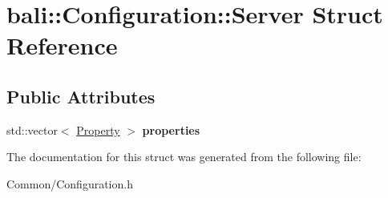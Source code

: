 \hypertarget{structbali_1_1_configuration_1_1_server}{\section{bali\-:\-:Configuration\-:\-:Server Struct Reference}
\label{structbali_1_1_configuration_1_1_server}
}
\subsection*{Public Attributes}
\begin{DoxyCompactItemize}
\item 
\hypertarget{structbali_1_1_configuration_1_1_server_a874b2e84fdd72284bf96215c40854981}{std\-::vector$<$ \hyperlink{structbali_1_1_configuration_1_1_property}{Property} $>$ {\bfseries properties}}\label{structbali_1_1_configuration_1_1_server_a874b2e84fdd72284bf96215c40854981}

\end{DoxyCompactItemize}


The documentation for this struct was generated from the following file\-:\begin{DoxyCompactItemize}
\item 
Common/Configuration.\-h\end{DoxyCompactItemize}

